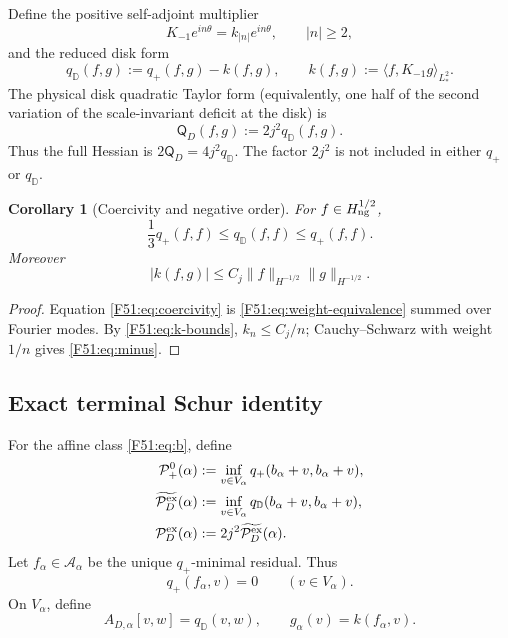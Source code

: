 \documentclass[11pt]{amsart}
\numberwithin{equation}{section}
\newtheorem{corollary}[theorem]{Corollary}
\theoremstyle{definition}
\theoremstyle{remark}
\newcommand{\qD}{q_{\mathbb D}}
\newcommand{\qplus}{q_+}
\newcommand{\Pplus}{\mathcal P_+^0}
\newcommand{\PD}{\mathcal P_D^{\rm ex}}
\begin{document}
Define the positive self-adjoint multiplier
\begin{equation}
 K_{-1}e^{in\theta}=k_{|n|}e^{in\theta},
 \qquad |n|\ge2,
\end{equation}
and the reduced disk form
\begin{equation}\label{F51:eq:qD}
 \qD(f,g):=\qplus(f,g)-k(f,g),
 \qquad
 k(f,g):=\langle f,K_{-1}g\rangle_{L^2_*}.
\end{equation}
The physical disk quadratic Taylor form (equivalently, one half of the
second variation of the scale-invariant deficit at the disk) is
\begin{equation}\label{F51:eq:physical-Q}
 \mathsf Q_D(f,g):=2j^2\qD(f,g).
\end{equation}
Thus the full Hessian is $2\mathsf Q_D=4j^2\qD$.  The factor $2j^2$ is
not included in either $\qplus$ or $\qD$.

\begin{corollary}[Coercivity and negative order]\label{F51:cor:coercivity}
For $f\in H_{\rm ng}^{1/2}$,
\begin{equation}\label{F51:eq:coercivity}
 \frac13\qplus(f,f)\le\qD(f,f)\le\qplus(f,f).
\end{equation}
Moreover
\begin{equation}\label{F51:eq:minus}
 |k(f,g)|\le C_j\|f\|_{H^{-1/2}}\|g\|_{H^{-1/2}}.
\end{equation}
\end{corollary}

\begin{proof}
Equation \eqref{F51:eq:coercivity} is \eqref{F51:eq:weight-equivalence} summed over
Fourier modes.  By \eqref{F51:eq:k-bounds}, $k_n\le C_j/n$; Cauchy--Schwarz with
weight $1/n$ gives \eqref{F51:eq:minus}.
\end{proof}

\subsection{Exact terminal Schur identity}

For the affine class \eqref{F51:eq:b}, define
\begin{align}
 \Pplus(\alpha)
 &:=\inf_{v\in V_\alpha}\qplus(b_\alpha+v,b_\alpha+v),\label{F51:eq:Pplus}\\
 \widetilde{\PD}(\alpha)
 &:=\inf_{v\in V_\alpha}\qD(b_\alpha+v,b_\alpha+v),\label{F51:eq:PDtilde}\\
 \PD(\alpha)&:=2j^2\widetilde{\PD}(\alpha).
 \label{F51:eq:PD}
\end{align}
Let $f_\alpha\in\mathcal A_\alpha$ be the unique $\qplus$-minimal
residual.  Thus
\begin{equation}\label{F51:eq:galerkin}
 \qplus(f_\alpha,v)=0\qquad(v\in V_\alpha).
\end{equation}
On $V_\alpha$, define
\begin{equation}
 A_{D,\alpha}[v,w]=\qD(v,w),
 \qquad g_\alpha(v)=k(f_\alpha,v).
\end{equation}
\end{document}
